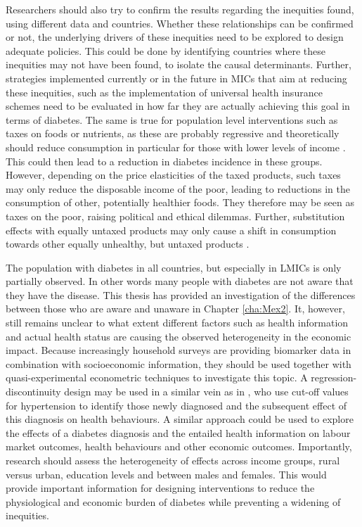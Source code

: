 Researchers should also try to confirm the results regarding the inequities found, using different data and countries. Whether these relationships can be confirmed or not, the underlying drivers of these inequities need to be explored to design adequate policies. This could be done by identifying countries where these inequities may not have been found, to isolate the causal determinants. Further, strategies implemented currently or in the future in \acp{MIC} that aim at reducing these inequities, such as the implementation of universal health insurance schemes need to be evaluated in how far they are actually achieving this goal in terms of diabetes. The same is true for population level interventions such as taxes on foods or nutrients, as these are probably regressive and theoretically should reduce consumption in particular for those with lower levels of income \parencite{Mytton2012c}. This could then lead to a reduction in diabetes incidence in these groups. However, depending on the price elasticities of the taxed products, such taxes may only reduce the disposable income of the poor, leading to reductions in the consumption of other, potentially healthier foods. They therefore may be seen as taxes on the poor, raising political and ethical dilemmas. Further, substitution effects with equally untaxed products may only cause a shift in consumption towards other equally unhealthy, but untaxed products \parencite{Mytton2012c}.

The population with diabetes in all countries, but especially in \acp{LMIC} is only partially observed. In other words many people with diabetes are not aware that they have the disease. This thesis has provided an investigation of the differences between those who are aware and unaware in Chapter \ref{cha:Mex2}. It, however, still remains unclear to what extent different factors such as health information and actual health status are causing the observed heterogeneity in the economic impact. Because increasingly household surveys are providing biomarker data in combination with socioeconomic information, they should be used together with quasi-experimental econometric techniques to investigate this topic. A regression-discontinuity design may be used in a similar vein as in \textcite{Zhao2013a}, who use cut-off values for hypertension to identify those newly diagnosed and the subsequent effect of this diagnosis on health behaviours. A similar approach could be used to explore the effects of a diabetes diagnosis and the entailed health information on labour market outcomes, health behaviours and other economic outcomes. Importantly, research should assess the heterogeneity of effects across income groups, rural versus urban, education levels and between males and females. This would provide important information for designing interventions to reduce the physiological and economic burden of diabetes while preventing a widening of inequities.

